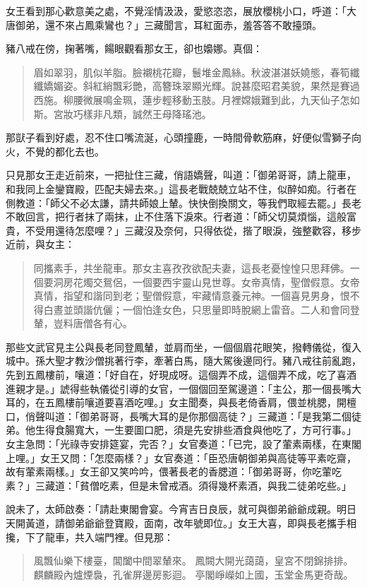 女王看到那心歡意美之處，不覺淫情汲汲，愛慾恣恣，展放櫻桃小口，呼道：「大唐御弟，還不來占鳳乘鸞也？」三藏聞言，耳紅面赤，羞答答不敢擡頭。

豬八戒在傍，掬著嘴，餳眼觀看那女王，卻也嬝娜。真個：
\begin{quote}
眉如翠羽，肌似羊脂。臉襯桃花瓣，鬟堆金鳳絲。秋波湛湛妖嬈態，春筍纖纖嬌媚姿。斜紅綃飄彩艷，高簪珠翠顯光輝。說甚麼昭君美貌，果然是賽過西施。柳腰微展鳴金珮，蓮步輕移動玉肢。月裡嫦娥難到此，九天仙子怎如斯。宮妝巧樣非凡類，誠然王母降瑤池。
\end{quote}

那獃子看到好處，忍不住口嘴流涎，心頭撞鹿，一時間骨軟筋麻，好便似雪獅子向火，不覺的都化去也。

只見那女王走近前來，一把扯住三藏，俏語嬌聲，叫道：「御弟哥哥，請上龍車，和我同上金鑾寶殿，匹配夫婦去來。」這長老戰兢兢立站不住，似醉如痴。行者在側教道：「師父不必太謙，請共師娘上輦。快快倒換關文，等我們取經去罷。」長老不敢回言，把行者抹了兩抹，止不住落下淚來。行者道：「師父切莫煩惱，這般富貴，不受用還待怎麼哩？」三藏沒及奈何，只得依從，揩了眼淚，強整歡容，移步近前，與女主：
\begin{quote}
同攜素手，共坐龍車。那女主喜孜孜欲配夫妻，這長老憂惶惶只思拜佛。一個要洞房花燭交鴛侶，一個要西宇靈山見世尊。女帝真情，聖僧假意。女帝真情，指望和諧同到老；聖僧假意，牢藏情意養元神。一個喜見男身，恨不得白晝並頭諧伉儷；一個怕逢女色，只思量即時脫網上雷音。二人和會同登輦，豈料唐僧各有心。
\end{quote}

那些文武官見主公與長老同登鳳輦，並肩而坐，一個個眉花眼笑，撥轉儀從，復入城中。孫大聖才教沙僧挑著行李，牽著白馬，隨大駕後邊同行。豬八戒往前亂跑，先到五鳳樓前，嚷道：「好自在，好現成呀。這個弄不成，這個弄不成，吃了喜酒進親才是。」諕得些執儀從引導的女官，一個個回至駕邊道：「主公，那一個長嘴大耳的，在五鳳樓前嚷道要喜酒吃哩。」女主聞奏，與長老倚香肩，偎並桃腮，開檀口，俏聲叫道：「御弟哥哥，長嘴大耳的是你那個高徒？」三藏道：「是我第二個徒弟。他生得食腸寬大，一生要圖口肥，須是先安排些酒食與他吃了，方可行事。」女主急問：「光祿寺安排筵宴，完否？」女官奏道：「已完，設了葷素兩樣，在東閣上哩。」女王又問：「怎麼兩樣？」女官奏道：「臣恐唐朝御弟與高徒等平素吃齋，故有葷素兩樣。」女王卻又笑吟吟，偎著長老的香腮道：「御弟哥哥，你吃葷吃素？」三藏道：「貧僧吃素，但是未曾戒酒。須得幾杯素酒，與我二徒弟吃些。」

說未了，太師啟奏：「請赴東閣會宴。今宵吉日良辰，就可與御弟爺爺成親。明日天開黃道，請御弟爺爺登寶殿，面南，改年號即位。」女王大喜，即與長老攜手相攙，下了龍車，共入端門裡。但見那：
\begin{quote}
風飄仙樂下樓臺，閶闔中間翠輦來。
鳳闕大開光藹藹，皇宮不閉錦排排。
麒麟殿內爐煙裊，孔雀屏邊房影迴。
亭閣崢嶸如上國，玉堂金馬更奇哉。
\end{quote}

